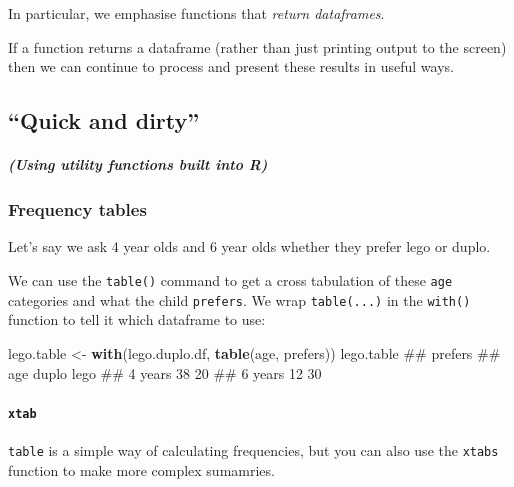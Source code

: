 \documentclass[]{article}
\newenvironment{Shaded}{\begin{snugshade}}{\end{snugshade}}
\newcommand{\KeywordTok}[1]{\textcolor[rgb]{0.13,0.29,0.53}{\textbf{#1}}}
\newcommand{\StringTok}[1]{\textcolor[rgb]{0.31,0.60,0.02}{#1}}
\newcommand{\NormalTok}[1]{#1}
\let\oldparagraph\paragraph
\renewcommand{\paragraph}[1]{\oldparagraph{#1}\mbox{}}
\let\oldsubparagraph\subparagraph
\renewcommand{\subparagraph}[1]{\oldsubparagraph{#1}\mbox{}}
\theoremstyle{definition}
\theoremstyle{definition}
\theoremstyle{definition}
\theoremstyle{remark}
\begin{document}
In particular, we emphasise functions that \emph{return dataframes}.

If a function returns a dataframe (rather than just printing output to
the screen) then we can continue to process and present these results in
useful ways.

\subsection*{\texorpdfstring{``Quick and
dirty''}{Quick and dirty}}\label{quick-and-dirty}

\subparagraph{(Using utility functions built into
R)}\label{using-utility-functions-built-into-r}

\hypertarget{frequency-tables}{\subsubsection*{Frequency
tables}\label{frequency-tables}}

Let's say we ask 4 year olds and 6 year olds whether they prefer lego or
duplo.

We can use the \texttt{table()} command to get a cross tabulation of
these \texttt{age} categories and what the child \texttt{prefers}. We
wrap \texttt{table(...)} in the \texttt{with()} function to tell it
which dataframe to use:

\begin{Shaded}
\begin{Highlighting}[]
\NormalTok{lego.table <-}\StringTok{ }\KeywordTok{with}\NormalTok{(lego.duplo.df, }\KeywordTok{table}\NormalTok{(age, prefers))}
\NormalTok{lego.table}
\NormalTok{##          prefers}
\NormalTok{## age       duplo lego}
\NormalTok{##   4 years    38   20}
\NormalTok{##   6 years    12   30}
\end{Highlighting}
\end{Shaded}

\paragraph{\texorpdfstring{\texttt{xtab}}{xtab}}\label{xtab}

\texttt{table} is a simple way of calculating frequencies, but you can
also use the \texttt{xtabs} function to make more complex sumamries.
\end{document}
